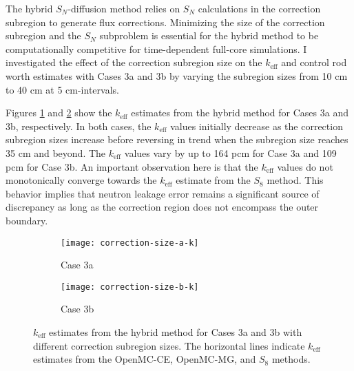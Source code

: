 The hybrid $S_N$-diffusion method relies on $S_N$ calculations in the correction subregion to
generate flux corrections. Minimizing the size of the correction subregion and the $S_N$ subproblem
is essential for the hybrid method to be computationally competitive for time-dependent full-core
simulations. I investigated the effect of the correction subregion size on the $k_\text{eff}$ and
control rod worth estimates with Cases 3a and 3b by varying the subregion sizes from 10 cm to 40 cm
at 5 cm-intervals.

Figures \ref{fig:v1-size-a-k} and \ref{fig:v1-size-b-k} show the $k_\text{eff}$ estimates from the
hybrid method for Cases 3a and 3b, respectively. In both cases, the $k_\text{eff}$ values initially
decrease as the correction subregion sizes increase before reversing in trend when the subregion
size reaches 35 cm and beyond. The $k_\text{eff}$ values vary by up to 164 pcm for Case 3a and 109
pcm for Case 3b. An important observation here is that the $k_\text{eff}$ values do not
monotonically converge towards the $k_\text{eff}$ estimate from the $S_8$ method. This behavior
implies that neutron leakage error remains a significant source of discrepancy as long as the
correction region does not encompass the outer boundary.


\begin{figure}[htb!]
  \centering
  \begin{subfigure}[b]{0.49\columnwidth}
    \centering
    \texttt{[image: correction-size-a-k]}
    \caption{Case 3a}
    \label{fig:v1-size-a-k}
  \end{subfigure}
  \hfill
  \begin{subfigure}[b]{0.49\columnwidth}
    \centering
    \texttt{[image: correction-size-b-k]}
    \caption{Case 3b}
    \label{fig:v1-size-b-k}
  \end{subfigure}
  \caption{$k_\text{eff}$ estimates from the hybrid method for Cases 3a and 3b with different
  correction subregion sizes. The horizontal lines indicate $k_\text{eff}$ estimates from the
  OpenMC-CE, OpenMC-MG, and $S_8$ methods.}
  \label{fig:v1-size-k}
\end{figure}

